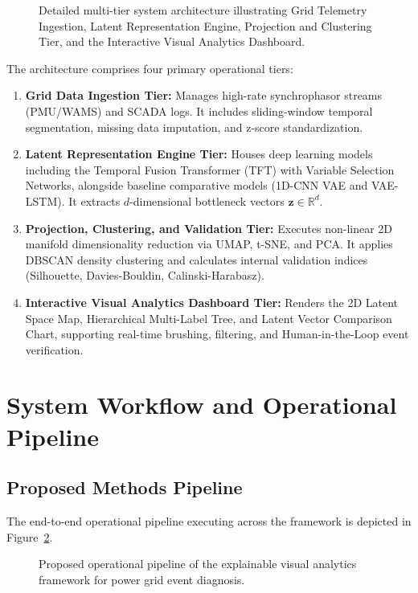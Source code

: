 \documentclass[12pt,a4paper]{report}
\begin{document}
\begin{figure}[H]
    \centering
    \caption{Detailed multi-tier system architecture illustrating Grid Telemetry Ingestion, Latent Representation Engine, Projection and Clustering Tier, and the Interactive Visual Analytics Dashboard.}
    \label{fig:system_arch_detailed}
\end{figure}

The architecture comprises four primary operational tiers:
\begin{enumerate}
    \item \textbf{Grid Data Ingestion Tier:} Manages high-rate synchrophasor streams (PMU/WAMS) and SCADA logs. It includes sliding-window temporal segmentation, missing data imputation, and z-score standardization.
    \item \textbf{Latent Representation Engine Tier:} Houses deep learning models including the Temporal Fusion Transformer (TFT) with Variable Selection Networks, alongside baseline comparative models (1D-CNN VAE and VAE-LSTM). It extracts $d$-dimensional bottleneck vectors $\mathbf{z} \in \mathbb{R}^d$.
    \item \textbf{Projection, Clustering, and Validation Tier:} Executes non-linear 2D manifold dimensionality reduction via UMAP, t-SNE, and PCA. It applies DBSCAN density clustering and calculates internal validation indices (Silhouette, Davies-Bouldin, Calinski-Harabasz).
    \item \textbf{Interactive Visual Analytics Dashboard Tier:} Renders the 2D Latent Space Map, Hierarchical Multi-Label Tree, and Latent Vector Comparison Chart, supporting real-time brushing, filtering, and Human-in-the-Loop event verification.
\end{enumerate}

\section{System Workflow and Operational Pipeline}

\subsection{Proposed Methods Pipeline}
The end-to-end operational pipeline executing across the framework is depicted in Figure~\ref{fig:framework}.

\begin{figure}[H]
    \centering
    \caption{Proposed operational pipeline of the explainable visual analytics framework for power grid event diagnosis.}
    \label{fig:framework}
\end{figure}
\end{document}
